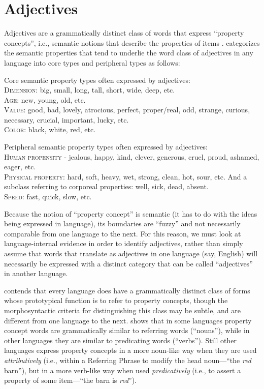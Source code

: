 \section{Adjectives}
\label{bkm:Ref422117197} \label{sec:adjectives} 

Adjectives are a grammatically distinct class of words that express “property concepts”, i.e., semantic notions that describe the properties of items \citep{thompson2004}. \citet[3--4]{dixon2004} categorizes the semantic properties that tend to underlie the word class of adjectives in any language into core types and peripheral types as follows:

\ea
Core semantic property types often expressed by adjectives: \\
\textsc{Dimension}: big, small, long, tall, short, wide, deep, etc. \\
\textsc{Age}: new, young, old, etc. \\
\textsc{Value}: good, bad, lovely, atrocious, perfect, proper/real, odd, strange, curious, necessary, crucial, important, lucky, etc. \\
\textsc{Color}: black, white, red, etc.
\z

\newpage
\ea
Peripheral semantic property types often expressed by adjectives: \\
\textsc{Human} \textsc{propensity} {}- jealous, happy, kind, clever, generous, cruel, proud, ashamed, eager, etc. \\
\textsc{Physical property}: hard, soft, heavy, wet, strong, clean, hot, sour, etc. And a   subclass referring to corporeal properties: well, sick, dead, absent. \\
\textsc{Speed}: fast, quick, slow, etc.
\z

Because the notion of “property concept” is semantic (it has to do with the ideas being expressed in language), its boundaries are “fuzzy” and not necessarily comparable from one language to the next. For this reason, we must look at language-internal evidence in order to identify adjectives, rather than simply assume that words that translate as adjectives in one language (say, English) will necessarily be expressed with a distinct category that can be called “adjectives” in another language.

\citet{dixon2004} contends that every language does have a grammatically distinct class of forms whose prototypical function is to refer to property concepts, though the morphosyntactic criteria for distinguishing this class may be subtle, and are different from one language to the next. \citet{thompson2004} shows that in some languages property concept words are grammatically similar to referring words (“nouns”), while in other languages they are similar to predicating words (“verbs”). Still other languages express property concepts in a more noun-like way when they are used \textit{attributively} (i.e., within a Referring Phrase to modify the head noun---“the \textit{red} barn”), but in a more verb-like way when used \textit{predicatively} (i.e., to assert a property of some item---“the barn is \textit{red}”).

